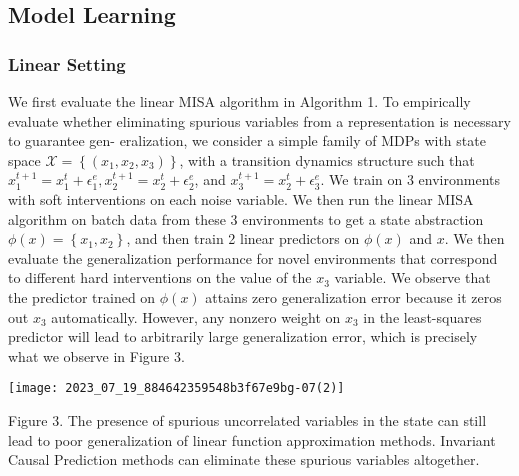 \documentclass[10pt]{article}
\begin{document}
\subsection{Model Learning}
\subsubsection{Linear Setting}
We first evaluate the linear MISA algorithm in Algorithm 1. To empirically evaluate whether eliminating spurious variables from a representation is necessary to guarantee gen- eralization, we consider a simple family of MDPs with state space $\mathcal{X}=\left\{\left(x_{1}, x_{2}, x_{3}\right)\right\}$, with a transition dynamics structure such that $x_{1}^{t+1}=x_{1}^{t}+\epsilon_{1}^{e}, x_{2}^{t+1}=x_{2}^{t}+\epsilon_{2}^{e}$, and $x_{3}^{t+1}=x_{2}^{t}+\epsilon_{3}^{e}$. We train on 3 environments with soft interventions on each noise variable. We then run the linear MISA algorithm on batch data from these 3 environments to get a state abstraction $\phi(x)=\left\{x_{1}, x_{2}\right\}$, and then train 2 linear predictors on $\phi(x)$ and $x$. We then evaluate the generalization performance for novel environments that correspond to different hard interventions on the value of the $x_{3}$ variable. We observe that the predictor trained on $\phi(x)$ attains zero generalization error because it zeros out $x_{3}$ automatically. However, any nonzero weight on $x_{3}$ in the least-squares predictor will lead to arbitrarily large generalization error, which is precisely what we observe in Figure 3.

\begin{center}
\texttt{[image: 2023\_07\_19\_884642359548b3f67e9bg-07(2)]}
\end{center}

Figure 3. The presence of spurious uncorrelated variables in the state can still lead to poor generalization of linear function approximation methods. Invariant Causal Prediction methods can eliminate these spurious variables altogether.
\end{document}
